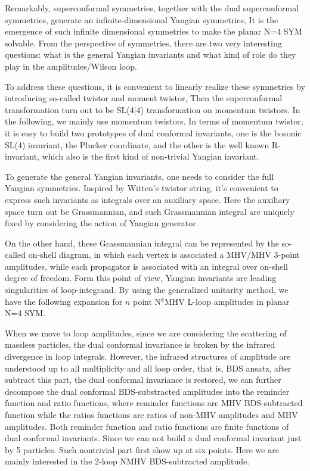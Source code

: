 \documentclass[a4paper,11pt]{article}
\begin{document}
Remarkably, superconformal symmetries, together with the dual superconformal symmetries, generate an infinite-dimensional Yangian symmetries, It is the emergence of such infinite dimensional symmetries to make the planar N=4 SYM solvable. From the perspective of symmetries, there are two very interesting questions: what is the general Yangian invariants and what kind of role do they play in the amplitudes/Wilson loop.



To address these questions, it is convenient to linearly realize these symmetries by introducing so-called twistor and moment twistor, Then the superconformal transformation turn out to be SL(4|4) transformation on momentum twistors. In the following, we mainly use momentum twistors. In terms of momentum twistor,  it is easy to build two prototypes of dual conformal invariants, one is the bosonic SL(4) invariant, the Plucker coordinate, and the other is the well known R-invariant, which also is the first kind of non-trivial Yangian invariant.



To generate the general Yangian invariants, one needs to consider the full Yangian symmetries. Inspired by Witten's twistor string, it's convenient to express such invariants as integrals over an auxiliary space. Here the auxiliary space turn out be Grassmannian, and such Grassmannian integral are uniquely fixed by considering the action of  Yangian  generator.



On the other hand, these Grassmannian integral can be represented by the so-called on-shell diagram, in which each vertex is associated a MHV/$\overline{\text{MHV}}$ 3-point amplitudes, while each propagator is associated with an integral over on-shell degree of freedom. Form this point of view, Yangian invariants are leading singularities of loop-integrand. By using the generalized unitarity method, we have the following expansion for $n$ point N$^{k}$MHV L-loop  amplitudes in planar N=4 SYM.


When we move to loop amplitudes, since we are considering the scattering of massless particles, the dual conformal invariance is broken by the infrared divergence in loop integrals. However, the  infrared structures of amplitude are understood up to all multiplicity and all loop order, that is, BDS ansatz, after subtract this part, the dual conformal invariance is restored, we can further decompose the dual conformal BDS-substracted amplitudes into the reminder function and ratio functions, where reminder functions are MHV BDS-subtracted function while the ratios functions are ratios of non-MHV amplitudes and MHV amplitudes. Both reminder function and ratio functions are finite functions of dual conformal invariants. Since we can not build a dual conformal invariant just by 5 particles. Such nontrivial part first show up at six points. Here we are mainly interested in the 2-loop NMHV BDS-subtracted amplitude. 
\end{document}
